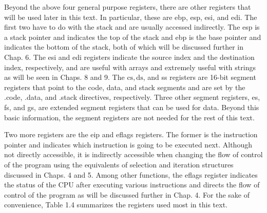 \documentclass[10pt]{book}
\begin{document}
Beyond the above four general purpose registers, there are other registers that will be used later in this text. In particular, these are ebp, esp, esi, and edi. The first two have to do with the stack and are usually accessed indirectly. The esp is a stack pointer and indicates the top of the stack and ebp is the base pointer and indicates the bottom of the stack, both of which will be discussed further in Chap. 6. The esi and edi registers indicate the source index and the destination index, respectively, and are useful with arrays and extremely useful with strings as will be seen in Chaps. 8 and 9. The $\mathrm{cs}, \mathrm{ds}$, and ss registers are 16-bit segment registers that point to the code, data, and stack segments and are set by the .code, .data, and .stack directives, respectively. Three other segment registers, es, fs, and gs, are extended segment registers that can be used for data. Beyond this basic information, the segment registers are not needed for the rest of this text.

Two more registers are the eip and eflags registers. The former is the instruction pointer and indicates which instruction is going to be executed next. Although not directly accessible, it is indirectly accessible when changing the flow of control of the program using the equivalents of selection and iteration structures discussed in Chaps. 4 and 5. Among other functions, the eflags register indicates the status of the CPU after executing various instructions and directs the flow of control of the program as will be discussed further in Chap. 4. For the sake of convenience, Table 1.4 summarizes the registers used most in this text.
\end{document}
